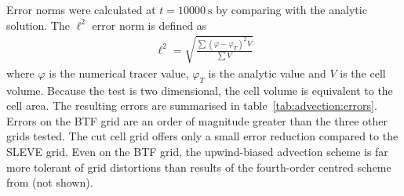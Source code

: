 Error norms were calculated at $t = \SI{10000}{\second}$ by comparing with the analytic solution.  The $\ell^2$ error norm is defined as
\begin{align}
\ell^2 = \sqrt{\frac{\sum \left( \varphi - \varphi_T \right)^2 V}{\sum V}}
\end{align}
where $\varphi$ is the numerical tracer value, $\varphi_T$ is the analytic value and $V$ is the cell volume.  Because the test is two dimensional, the cell volume is equivalent to the cell area.  The resulting errors are summarised in table~\ref{tab:advection:errors}.  Errors on the BTF grid are an order of magnitude greater than the three other grids tested.  The cut cell grid offers only a small error reduction compared to the SLEVE grid.  Even on the BTF grid, the upwind-biased advection scheme is far more tolerant of grid distortions than results of the fourth-order centred scheme from \textcite{schaer2002} (not shown).


